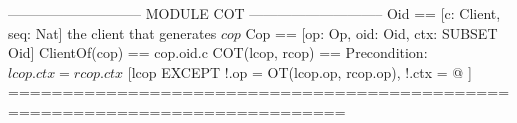 \documentclass[preview, border={5pt 0pt 5pt 1pt}]{standalone}
\begin{document}
\begin{tla}
----------------------------- MODULE COT -----------------------------
Oid == [c: Client, seq: Nat]                      \* the client that generates $cop$
Cop == [op: Op, oid: Oid, ctx: SUBSET Oid]      ClientOf(cop) == cop.oid.c 
COT(lcop, rcop) == \* Precondition: $lcop.ctx = rcop.ctx$
    [lcop EXCEPT !.op = OT(lcop.op, rcop.op), !.ctx = @ ]
=============================================================================
\end{tla}
\begin{tlatex}
\@x{}\moduleLeftDash{}\moduleRightDash\@xx{}%
%
%
\@xx{}%
%
%
\@xx{}%
\@x{}\bottombar\@xx{}%
\end{tlatex}
\end{document}
